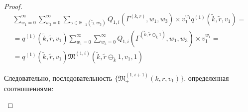 \documentclass{report}
\begin{document}
\begin{proof}
\begin{multline*}
 \sum_{w_1=0}^{\infty}\sum_{w_3=0}^{\infty} \sum_{\gamma \in {\mathbb H}_{-1}(\tilde{\gamma},w_3)} Q_{1,i}(\Gamma^{(k,r)},w_1,w_3)  \times  v_1^{w_1} q^{(1)}(\tilde{k},\tilde{r},v_1) = \\ = q^{(1)}(\tilde{k},\tilde{r},v_1)  \sum_{w_1=0}^{\infty}\sum_{w_3=0}^{\infty}  Q_{1,i}(\Gamma^{(\tilde{k},\tilde{r}\ominus_{\tilde{k}} 1)},w_1,w_3)  \times  v_1^{w_1} = \\ =
 q^{(1)}(\tilde{k},\tilde{r},v_1)  \mathfrak{M}^{(1,i)}(\tilde{k},\tilde{r}\ominus_{\tilde{k}} 1,v_1,1)  
\end{multline*}

Следовательно, последовательность $\{\mathfrak{M}_+^{(1,i+1)}(k,r,v_1)\}$, определенная соотношениями:
\begin{enumerate}


\end{enumerate}
\end{proof}
\end{document}
